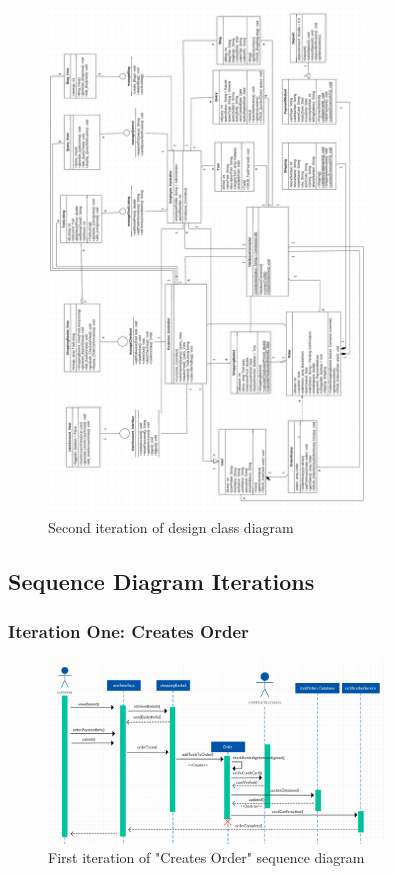 \begin{figure}[H]
      \centering
      \includegraphics[trim = 0 0 0 0, clip, width=0.75\textwidth]{TempImg/DClass2.png}
      \caption{Second iteration of design class diagram}
\end{figure}


\subsection{Sequence Diagram Iterations}


\subsubsection{Iteration One: Creates Order}

\begin{figure}[H]
      \centering
      \includegraphics[trim = 0 0 0 0, clip, width=0.8\textwidth]{TempImg/oldSD1_1.png}
      \caption{First iteration of "Creates Order" sequence diagram}
\end{figure}

